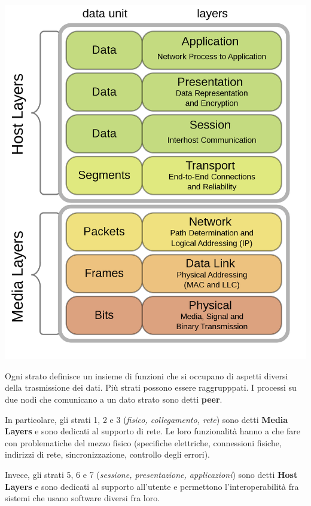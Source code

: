         \begin{center}
            \includegraphics[scale=0.25]{images/OSI.png}
        \end{center}
        
        Ogni strato definisce un insieme di funzioni che si occupano di aspetti diversi della trasmissione dei dati. Più strati possono essere raggrupppati. I processi su due nodi che comunicano a un dato strato sono detti \textbf{peer}.
        
        In particolare, gli strati 1, 2 e 3 (\textit{fisico, collegamento, rete}) sono detti \textbf{Media Layers} e sono dedicati al supporto di rete. Le loro funzionalità hanno a che fare con problematiche del mezzo fisico (specifiche elettriche, connessioni fisiche, indirizzi di rete, sincronizzazione, controllo degli errori).
        
        Invece, gli strati 5, 6 e 7 (\textit{sessione, presentazione, applicazioni}) sono detti \textbf{Host Layers} e sono dedicati al supporto all'utente e permettono l'interoperabilità fra sistemi che usano software diversi fra loro. 
        
